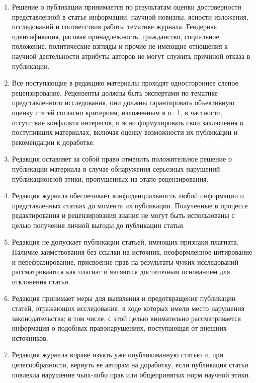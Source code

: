 \documentclass[10pt,a4paper]{book}
\begin{document}
\begin{enumerate}[itemsep=0pt,parsep=2pt,topsep=2pt,partopsep=0pt]
\item Решение о публикации принимается по результатам оценки достоверности представленной
      в статье информации, научной новизны, ясности изложения, исследований и соответствия
      работы тематике журнала. Гендерная идентификация, расовая принадлежность,
      гражданство, социальное положение, политические взгляды и прочие не имеющие
      отношения к научной деятельности атрибуты авторов не могут служить причиной отказа в
      публикации.
\item Все поступающие в редакцию материалы проходят одностороннее слепое рецензирование.
      Рецензенты должны быть экспертами по тематике представленного исследования, они
      должны гарантировать объективную оценку статей согласно критериям, изложенным в п.~1,
      в частности, отсутствие конфликта интересов, и ясно формулировать свои заключения о
      поступивших материалах, включая оценку возможности их публикации и рекомендации к
      доработке.
\item Редакция оставляет за собой право отменить положительное решение о публикации
      материала в случае обнаружения серьезных нарушений публикационной этики, пропущенных
      на этапе рецензирования.
\item Редакция журнала обеспечивает конфиденциальность любой информации о представленных
      статьях до момента их публикации. Полученные в процессе редактирования и
      рецензирования знания не могут быть использованы с целью получения личной выгоды до
      публикации статьи.
\item Редакция не допускает публикации статьей, имеющих признаки плагиата. Наличие
      заимствования без ссылки на источник, неоформленное цитирование и перефразирование,
      присвоение прав на результаты чужих исследований рассматриваются как плагиат и
      являются достаточным основанием для отклонения статьи.
\item Редакция принимает меры для выявления и предотвращения публикации статей, отражающих
      исследования, в ходе которых имели место нарушения законодательства; в том числе, с
      этой целью внимательно рассматривается информация о подобных правонарушениях,
      поступающая от внешних источников.
\item Редакция журнала вправе изъять уже опубликованную статью и, при целесообразности,
      вернуть ее авторам на доработку, если публикация статьи повлекла нарушение чьих-либо
      прав или общепринятых норм научной этики.

\end{enumerate}
\end{document}
